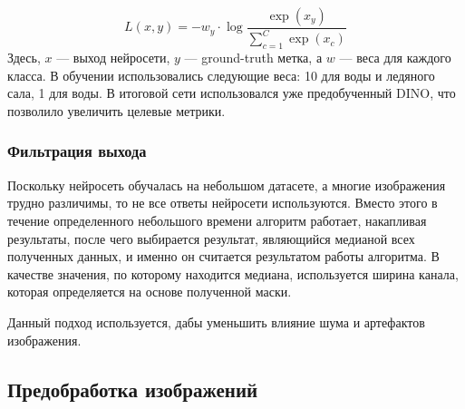 \[L(x,y) = -w_y \cdot \log\frac{\exp(x_y)}{\sum\limits_{c=1}^C \exp(x_c)}\]
Здесь, $x$ --- выход нейросети, $y$ --- ground-truth метка, а $w$ --- веса для каждого класса. В обучении использовались следующие веса: 10 для воды и ледяного сала, 1 для воды.
В итоговой сети использовался уже предобученный DINO, что позволило увеличить целевые метрики.

\subsubsection{Фильтрация выхода}
Поскольку нейросеть обучалась на небольшом датасете, а многие изображения трудно различимы, то не все ответы нейросети используются. Вместо этого в течение определенного 
небольшого времени алгоритм работает, накапливая результаты, после чего выбирается результат, являющийся медианой всех полученных данных, и именно он считается 
результатом работы алгоритма. В качестве значения, по которому находится медиана, используется ширина канала, которая определяется на основе полученной маски.

Данный подход используется, дабы уменьшить влияние шума и артефактов изображения.

\subsection{Предобработка изображений}

